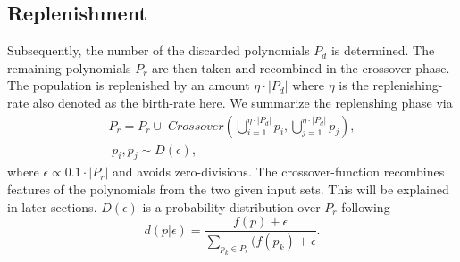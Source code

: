 \documentclass[11pt,a4paper]{article}
\begin{document}
\subsection*{Replenishment}
Subsequently, the number of the discarded polynomials $P_d$ is determined. The remaining polynomials $P_r$ are then taken and recombined in the crossover phase. The population is replenished by an amount $\eta \cdot |P_d|$ where $\eta$ is the replenishing-rate also denoted as the birth-rate here. We summarize the replenshing phase via
\begin{align*}
P_r = P_r \cup \; Crossover \left(\bigcup_{i=1}^{\eta \cdot |P_d|} p_i, \bigcup_{j=1}^{\eta \cdot |P_d|} p_j\right), \\ \; p_i, p_j \sim D(\epsilon),
\end{align*}
where $\epsilon \propto 0.1 \cdot |P_r|$ and avoids zero-divisions. The crossover-function recombines features of the polynomials from the two given input sets. This will be explained in later sections. $D(\epsilon)$ is a probability distribution over $P_r$ following 
\[ 
d(p|\epsilon)= \frac{f(p)+\epsilon}{\sum_{p_k \in P_r} (f(p_k) + \epsilon}.
\]
\end{document}
